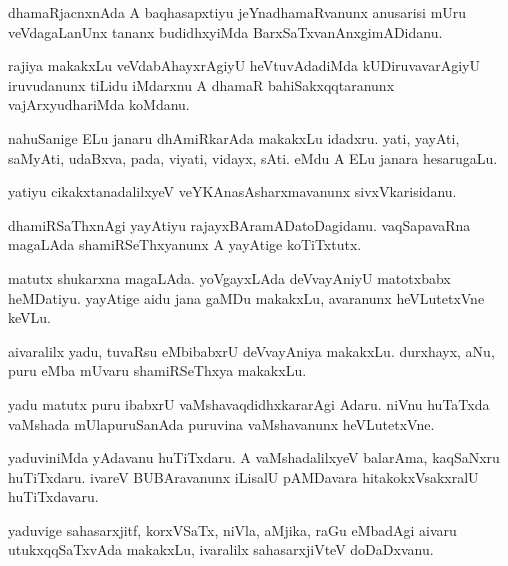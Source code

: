 \documentclass{article}
\begin{document}
\begin{mn}
dhamaRjacnxnAda A baqhasapxtiyu jeYnadhamaRvanunx anusarisi mUru
veVdagaLanUnx tananx budidhxyiMda BarxSaTxvanAnxgimADidanu.
\end{mn}

\begin{mn}
rajiya makakxLu veVdabAhayxrAgiyU heVtuvAdadiMda kUDiruvavarAgiyU
iruvudanunx tiLidu iMdarxnu A dhamaR bahiSakxqqtaranunx
vajArxyudhariMda koMdanu.
\end{mn}

\begin{mn}
nahuSanige ELu janaru dhAmiRkarAda makakxLu idadxru. yati, yayAti,
saMyAti, udaBxva, pada, viyati, vidayx, sAti. eMdu A ELu janara hesarugaLu.
\end{mn}

\begin{mn}
yatiyu cikakxtanadalilxyeV veYKAnasAsharxmavanunx sivxVkarisidanu.
\end{mn}

\begin{mn}%
dhamiRSaThxnAgi yayAtiyu rajayxBAramADatoDagidanu. vaqSapavaRna
magaLAda shamiRSeThxyanunx A yayAtige koTiTxtutx.
\end{mn}

\begin{mn}
matutx shukarxna magaLAda. yoVgayxLAda deVvayAniyU matotxbabx
heMDatiyu. yayAtige aidu jana gaMDu makakxLu, avaranunx heVLutetxVne keVLu.
\end{mn}

\begin{mn}
aivaralilx yadu, tuvaRsu eMbibabxrU deVvayAniya makakxLu. durxhayx,
aNu, puru eMba mUvaru shamiRSeThxya makakxLu.
\end{mn}

\begin{mn}
yadu matutx puru ibabxrU vaMshavaqdidhxkararAgi Adaru. niVnu huTaTxda
vaMshada mUlapuruSanAda puruvina vaMshavanunx heVLutetxVne.
\end{mn}

\begin{mn}%
yaduviniMda yAdavanu huTiTxdaru. A vaMshadalilxyeV balarAma, kaqSaNxru
huTiTxdaru. ivareV BUBAravanunx iLisalU pAMDavara hitakokxVsakxralU huTiTxdavaru.
\end{mn}

\begin{mn}%
yaduvige sahasarxjitf, korxVSaTx, niVla, aMjika, raGu eMbadAgi aivaru
utukxqqSaTxvAda makakxLu, ivaralilx sahasarxjiVteV doDaDxvanu.
\end{mn}
\end{document}
